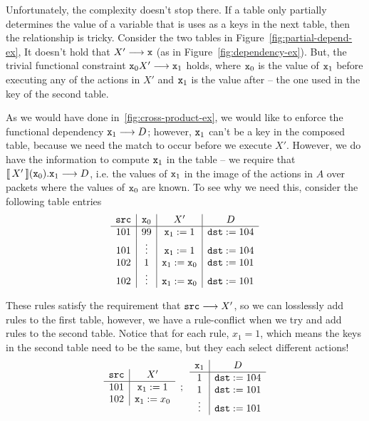 Unfortunately, the complexity doesn't stop there. If a table only
partially determines the value of a variable that is uses as a keys in
the next table, then the relationship is tricky. Consider the two
tables in Figure~\ref{fig:partial-depend-ex}, It doesn't hold that
$X' \longrightarrow \texttt{x}$ (as in
Figure~\ref{fig:dependency-ex}). But, the trivial functional
constraint $\texttt{x}_0X' \longrightarrow \texttt{x}_1$
holds, where $\texttt{x}_0$ is the value of $\texttt{x}_1$ before
executing any of the actions in $X'$ and $\texttt{x}_1$ is the value
after -- the one used in the key of the second table.

As we would have done in~\ref{fig:cross-product-ex}, we would like to
enforce the functional dependency $\texttt{x}_1 \longrightarrow D$;
however, $\texttt{x}_1$ can't be a key in the composed table, because we need
the match to occur before we execute $X'$. However, we do have the
information to compute $\texttt{x}_1$ in the table -- we require that
$\llbracket\,X'\,\rrbracket(\texttt{x}_0).\texttt{x}_1\longrightarrow D$, i.e. the
values of $\texttt{x}_1$ in the image of the actions in $A$ over
packets where the values of $\texttt{x}_0$ are known. To see why we
need this, consider the following table entries
\[
  \begin{array}{c|c|c|c}
    \texttt{src} & \texttt{x}_0 & X' & D\\ \hline
    101 & 99 & \texttt{x}_1 := 1 & \texttt{dst} := 104 \\
    101 & \vdots & \texttt{x}_1 := 1 & \texttt{dst} := 104 \\
    102 & 1 & \texttt{x}_1 := \texttt{x}_0 & \texttt{dst} := 101 \\
    102 & \vdots & \texttt{x}_1 := \texttt{x}_0 & \texttt{dst} := 101 \\
  \end{array}
\]

These rules satisfy the requirement that
$\texttt{src}\longrightarrow X'$, so we can losslessly add rules to
the first table, however, we have a rule-conflict when we try and add
rules to the second table. Notice that for each rule, $x_1 = 1$, which
means the keys in the second table need to be the same, but they each
select different actions!
\[
  \begin{array}{c|c}
    \texttt{src} & X'\\ \hline
    101 & \texttt{x}_1 := 1  \\
    102 & \texttt{x}_1 := x_0 \\
  \end{array}\enspace ; \enspace
  \begin{array}{c|c}
    \texttt{x}_1 & D\\ \hline
    1 & \texttt{dst} := 104 \\
    1 & \texttt{dst} := 101 \\
    \vdots & \texttt{dst} := 101 \\
  \end{array}  
\]

